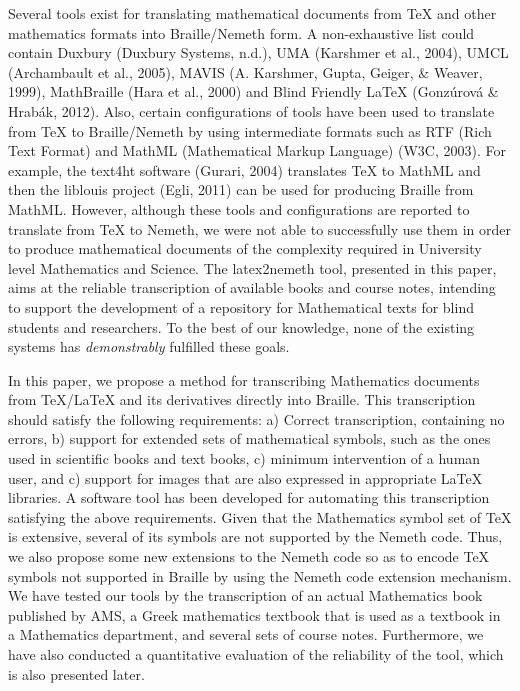 \documentclass[11.5pt]{sig-alternate} %
\begin{document}
\begin{large}
Several tools exist for translating mathematical documents from TeX and other mathematics formats into Braille/Nemeth form. A non-exhaustive list could contain Duxbury (Duxbury Systems, n.d.), UMA (Karshmer et al., 2004), UMCL (Archambault et al., 2005), MAVIS (A. Karshmer, Gupta, Geiger, \& Weaver, 1999), MathBraille (Hara et al., 2000) and Blind Friend\-ly LaTeX (Gonzúrová \& Hrabák, 2012). Also, certain configurations of tools have been used to translate from TeX to Braille/Nemeth by using intermediate formats such as RTF (Rich Text Format) and MathML (Mathematical Markup Language) (W3C, 2003). For example, the text4\-ht software (Gurari, 2004) translates TeX to MathML and then the liblouis project (Egli, 2011) can be used for producing Braille from MathML.  However, although these tools and configurations are reported to translate from TeX to Nemeth, we were not able to successfully use them in order to produce mathematical documents of the complexity required in University level Mathematics and Science. The latex2nemeth tool, presented in this paper, aims at the reliable transcription of available books and course notes, intending to support the development of a repository for Mathematical texts for blind students and researchers. To the best of our knowledge, none of the existing systems has \textit{demonstrably} fulfilled these goals.

In this paper, we propose a method for transcribing Mathematics documents from TeX/La\-TeX and its derivatives directly into Braille. This transcription should satisfy the following requirements: a) Correct transcription, containing no errors, b) support for extended sets of mathematical symbols, such as the ones used in scientific books and text books, c) minimum intervention of a human user, and c) support for images that are also expressed in appropriate LaTeX libraries. A software tool has been developed for automating this transcription satisfying the above requirements. Given that the Mathematics symbol set of TeX is extensive, several of its symbols are not supported by the Nemeth code. Thus, we also propose some new extensions to the Nemeth code so as to encode TeX symbols not supported in Braille by using the Nemeth code extension mechanism. We have tested our tools by the transcription of an actual Mathematics book published by AMS, a Greek mathematics textbook that is used as a textbook in a Mathematics department, and several sets of course notes. Furthermore, we have also conducted a quantitative evaluation of the reliability of the tool, which is also presented later.


\end{large}
\end{document}
